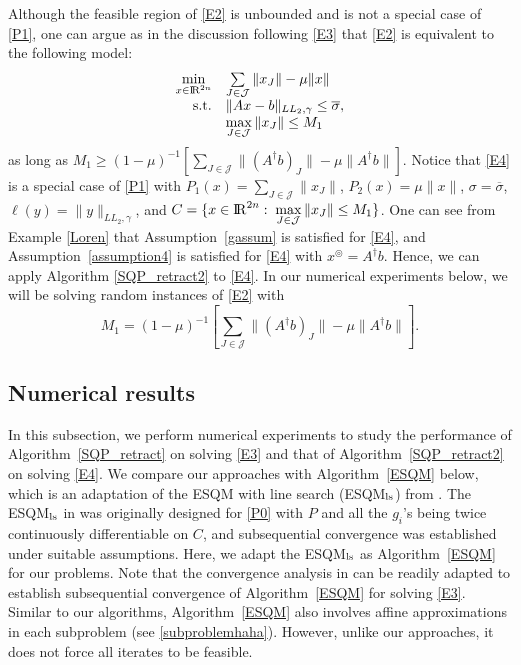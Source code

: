\documentclass[10pt]{article}
\numberwithin{equation}{section}
\def\R{{\rm I\!R}}
\def\xfeasss{x^\circledcirc}
\begin{document}
{Although the feasible region of \eqref{E2} is unbounded and is not a special case of \eqref{P1}, one can argue as in the discussion following \eqref{E3} that \eqref{E2} is equivalent to the following model:
\begin{equation}\label{E4}
  \begin{array}{rl}
\min\limits_{x\in\R^{2n}} & \sum\limits_{J\in\mathcal{J}}\|x_J\| - \mu\|x\| \\
{\rm s.t.} & \|Ax - b\|_{LL_2,\gamma}\leq \overline{\sigma},\\
           & \max\limits_{J\in \mathcal{J}}\|x_J\| \leq M_1
  \end{array}
\end{equation}
as long as $M_1 \ge (1 - \mu)^{-1}[\sum\limits_{J\in\mathcal{J}}\|(A^\dagger b)_J\| - \mu\|A^\dagger b\|]$.
Notice that \eqref{E4} is a special case of \eqref{P1} with $P_1(x) = \sum\limits_{J\in\mathcal{J}}\|x_J\|$, $P_2(x) = \mu\|x\|$,  $\sigma=\overline{\sigma}$, $\ell(y) = \|y\|_{LL_2,\gamma}$, and $C = \{x\in\R^{2n}:\; \max\limits_{J\in \mathcal{J}}\|x_J\| \leq M_1\}$. One can see  from Example \ref{Loren} that Assumption~\ref{gassum} is satisfied for \eqref{E4}, and Assumption~\ref{assumption4} is satisfied for \eqref{E4} with $\xfeasss = A^\dagger b$. Hence, we can apply Algorithm \ref{SQP_retract2} to \eqref{E4}. In our numerical experiments below, we will be solving random instances of \eqref{E2} with $$M_1 = (1 - \mu)^{-1}[\sum\limits_{J\in\mathcal{J}}\|(A^\dagger b)_J\| - \mu\|A^\dagger b\|].$$ }

\subsection{Numerical results}
In this subsection, we perform numerical experiments to study the performance of Algorithm~\ref{SQP_retract} on solving \eqref{E3} and that of Algorithm~\ref{SQP_retract2} on solving \eqref{E4}.
We compare our approaches with Algorithm~\ref{ESQM} below, which is an adaptation of the ESQM with line search (ESQM$_{\rm ls}$) from \cite{Au13}. The ESQM$_{\rm ls}$ in \cite{Au13} was originally designed for \eqref{P0} with $P$ and all the $g_i$'s being twice continuously differentiable on $C$, and subsequential convergence was established under suitable assumptions. Here, we adapt the ESQM$_{\rm ls}$ as Algorithm~\ref{ESQM} for our problems. Note that the convergence analysis in \cite{Au13} can be readily adapted to establish subsequential convergence of Algorithm~\ref{ESQM} for solving \eqref{E3}. Similar to our algorithms, Algorithm~\ref{ESQM} also involves affine approximations in each subproblem (see \eqref{subproblemhaha}). However, unlike our approaches, it does not force all iterates to be feasible.
\end{document}
